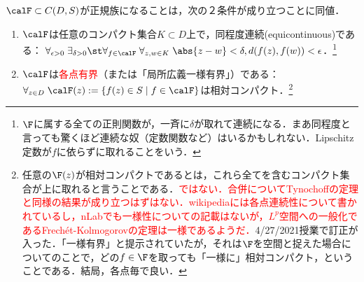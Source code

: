 \documentclass[uplatex, dvipdfmx]{jsreport}
\begin{document}
\begin{theorem}\label{thm-Ascoli-Arzelà}
    $\calF\subset C(D,S)$が正規族になることは，次の２条件が成り立つことに同値．
    \begin{enumerate}
        \item $\calF$は任意のコンパクト集合$K\subset D$上で，同程度連続(equicontinuous)である：
        $\forall_{\epsilon>0}\;\exists_{\delta>0}\st\forall_{f\in\calF}\;\forall_{z,w\in K}\;\abs{z-w}<\delta,d(f(z),f(w))<\epsilon$．\footnote{$\F$に属する全ての正則関数が，一斉に$\delta$が取れて連続になる．まあ同程度と言っても驚くほど連続な奴（定数関数など）はいるかもしれない．Lipschitz定数が$f$に依らずに取れることをいう．}
        \item $\calF$は\textcolor{red}{各点有界}（または「局所広義一様有界」）である：$\forall_{z\in D}\;\calF(z):=\{f(z)\in S\mid f\in\calF\}$は相対コンパクト．\footnote{任意の$\F(z)$が相対コンパクトであるとは，これら全てを含むコンパクト集合が上に取れると言うことである．\textcolor{red}{ではない．合併についてTynochoffの定理と同様の結果が成り立つはずはない．wikipediaには各点連続性について書かれているし，nLabでも一様性についての記載はないが，$L^p$空間への一般化であるFrechét-Kolmogorovの定理は一様であるようだ．}4/27/2021授業で訂正が入った．「一様有界」と提示されていたが，それは$\F$を空間と捉えた場合についてのことで，どの$f\in\F$を取っても「一様に」相対コンパクト，ということである．結局，各点毎で良い．}
    \end{enumerate}
\end{theorem}
\end{document}

